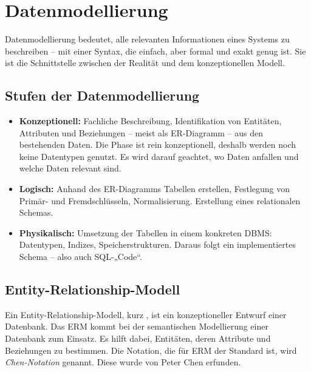 \section{Datenmodellierung}
Datenmodellierung bedeutet, alle relevanten Informationen eines Systems zu beschreiben -- mit einer Syntax, die einfach, aber formal und exakt genug ist. Sie ist die Schnittstelle zwischen der Realität und dem konzeptionellen Modell.
\subsection{Stufen der Datenmodellierung}
\begin{itemize}
  \item \textbf{Konzeptionell:} Fachliche Beschreibung, Identifikation von Entitäten, Attributen und Beziehungen -- meist als ER-Diagramm -- aus den bestehenden Daten. Die Phase ist rein konzeptionell, deshalb werden noch keine Datentypen genutzt.
  Es wird darauf geachtet, wo Daten anfallen und welche Daten relevant sind.
  \item \textbf{Logisch:} Anhand des ER-Diagramms Tabellen erstellen, Festlegung von Primär- und Fremdschlüsseln, Normalisierung. Erstellung eines relationalen Schemas.
  \item \textbf{Physikalisch:} Umsetzung der Tabellen in einem konkreten DBMS: Datentypen, Indizes, Speicherstrukturen. Daraus folgt ein implementiertes Schema -- also auch SQL-„Code“.
\end{itemize}
\subsection{Entity-Relationship-Modell}
Ein Entity-Relationship-Modell, kurz , ist ein konzeptioneller
Entwurf einer Datenbank. Das ERM kommt bei der semantischen
Modellierung einer Datenbank zum Einsatz. Es hilft dabei, Entitäten,
deren Attribute und Beziehungen zu bestimmen. Die Notation, die für ERM der Standard ist, wird \emph{Chen-Notation} genannt. Diese wurde von Peter Chen erfunden.

